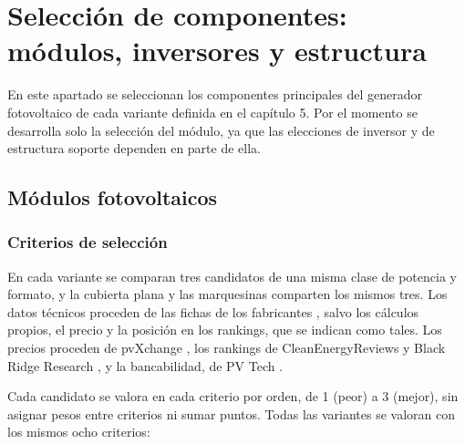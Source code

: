 \section{Selección de componentes: módulos, inversores y estructura}
\label{sec:diseno-componentes}


En este apartado se seleccionan los componentes principales del generador fotovoltaico de cada variante definida en el capítulo 5. Por el momento se desarrolla solo la selección del módulo, ya que las elecciones de inversor y de estructura soporte dependen en parte de ella.

\subsection{Módulos fotovoltaicos}
\label{subsec:diseno-modulos}

\subsubsection{Criterios de selección}
\label{subsubsec:diseno-criterios-modulos}

En cada variante se comparan tres candidatos de una misma clase de potencia y formato, y la cubierta plana y las marquesinas comparten los mismos tres. Los datos técnicos proceden de las fichas de los fabricantes \cite{OnyxGL03,PolysolarPSMCST60,SolarwattVision36M,AIKONeostar2Pplus,TrinaVertexSplus440,JinkoTigerNeo525,LONGiHiMO9,JAJAM66D45,TrinaVertexN620}, salvo los cálculos propios, el precio y la posición en los rankings, que se indican como tales. Los precios proceden de pvXchange \cite{PvXchangePrecios2026}, los rankings de CleanEnergyReviews \cite{CleanEnergyReviews2025} y Black Ridge Research \cite{BlackRidge2025}, y la bancabilidad, de PV Tech \cite{PVTechBancabilidad}.

Cada candidato se valora en cada criterio por orden, de 1 (peor) a 3 (mejor), sin asignar pesos entre criterios ni sumar puntos. Todas las variantes se valoran con los mismos ocho criterios:

